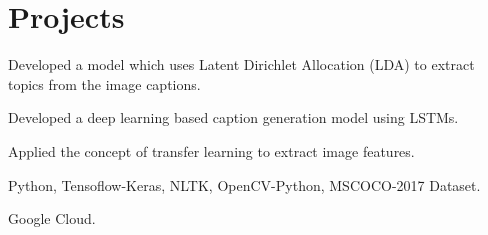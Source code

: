 
\section{Projects}

\begin{tightemize}
\item Developed a model which uses Latent Dirichlet Allocation (LDA) to extract topics from the image captions.
\item Developed a  deep learning based caption generation model using LSTMs.
\item Applied the concept of transfer learning to extract image features.
\item {} Python, Tensoflow-Keras, NLTK, OpenCV-Python, MSCOCO-2017 Dataset.
\item {} Google Cloud.
\end{tightemize}
\sectionsep
